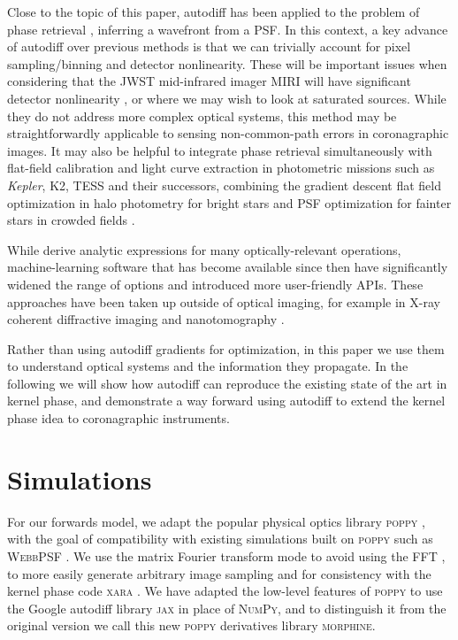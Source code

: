 \documentclass[modern]{aastex63}
\begin{document}
Close to the topic of this paper, autodiff has been applied to the problem of phase retrieval \citep{jurling14,paine19}, inferring a wavefront from a PSF. In this context, a key advance of autodiff over previous methods is that we can trivially account for pixel sampling/binning and detector nonlinearity. These will be important issues when considering that the JWST mid-infrared imager MIRI will have significant detector nonlinearity \citep{rieke15}, or where we may wish to look at saturated sources. While they do not address more complex optical systems, this method may be straightforwardly applicable to sensing non-common-path errors in coronagraphic images. It may also be helpful to integrate phase retrieval simultaneously with flat-field calibration and light curve extraction in photometric missions such as \textit{Kepler}, K2, TESS and their successors, combining the gradient descent flat field optimization in halo photometry for bright stars \citep{white17,pope19} and PSF optimization for fainter stars in crowded fields \citep[e.g.][]{eleanor,nardiello19}. 

While \citet{jurling14} derive analytic expressions for many optically-relevant operations, machine-learning software that has become available since then have significantly widened the range of options and introduced more user-friendly APIs. These approaches have been taken up outside of optical imaging, for example in X-ray coherent diffractive imaging \citep{kandel19,nashed19} and nanotomography \citep{Dueaay3700}.

Rather than using autodiff gradients for optimization, in this paper we use them to understand optical systems and the information they propagate.
In the following we will show how autodiff can reproduce the existing state of the art in kernel phase, and demonstrate a way forward using autodiff to extend the kernel phase idea to coronagraphic instruments.

\section{Simulations}
\label{sec:method}

For our forwards model, we adapt the popular physical optics library \textsc{poppy} \citep{poppy}, with the goal of compatibility with existing simulations built on \textsc{poppy} such as \textsc{WebbPSF} \citep{webbpsf}. We use the matrix Fourier transform mode to avoid using the FFT \citep{soummer07}, to more easily generate arbitrary image sampling and for consistency with the kernel phase code \textsc{xara} \citep{martinache20}. We have adapted the low-level features of \textsc{poppy} to use the Google autodiff library \textsc{jax} \citep{jax} in place of \textsc{NumPy}, and to distinguish it from the original version we call this new \textsc{poppy} derivatives library \textsc{morphine}. %
\end{document}
